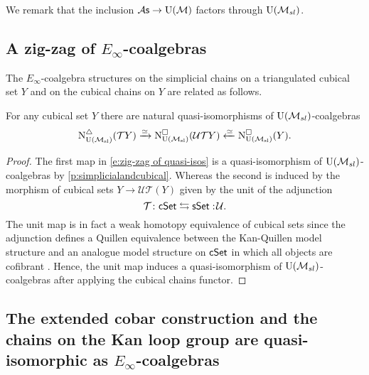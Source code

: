 We remark that the inclusion ${\mathcal{A}\mathsf{s}} \to {\operatorname{U}(\mathcal{M})}$ factors through ${\operatorname{U}(\mathcal{M}_{sl})}$.

\subsection{A zig-zag of $E_\infty$-coalgebras}
The $E_{\infty}$-coalgebra structures on the simplicial chains on a triangulated cubical set $Y$ and on the cubical chains on $Y$ are related as follows.

\begin{lemma} \label{l:zigzag} 
	For any cubical set $Y$ there are natural quasi-isomorphisms of ${\operatorname{U}(\mathcal{M}_{sl})}$-coalgebras
	\begin{equation} \label{e:zig-zag of quasi-isos}
	\operatorname{N^{\triangle}_{{\operatorname{U}(\mathcal{M}_{sl})}}}(\mathcal{T}Y) \xrightarrow{\simeq}
	\operatorname{N^{\square}_{{\operatorname{U}(\mathcal{M}_{sl})}}}(\mathcal{U}\mathcal{T}Y) \xleftarrow{\simeq}
	\operatorname{N^{\square}_{{\operatorname{U}(\mathcal{M}_{sl})}}}(Y).
	\end{equation}	
\end{lemma}

\begin{proof}
	The first map in \eqref{e:zig-zag of quasi-isos} is a quasi-isomorphism of ${\operatorname{U}(\mathcal{M}_{sl})}$-coalgebras by \cref{p:simplicialandcubical}.
	Whereas the second is induced by the morphism of cubical sets $Y \to \mathcal{U} \mathcal{T} (Y)$ given by the unit of the adjunction
	\begin{equation*}
	\mathcal{T} \colon \mathsf{cSet} \leftrightarrows \mathsf{sSet} :\! \mathcal{U}.
	\end{equation*}
	The unit map is in fact a weak homotopy equivalence of cubical sets since the adjunction defines a Quillen equivalence between the Kan-Quillen model structure and an analogue model structure on $\mathsf{cSet}$ in which all objects are cofibrant \cite{cisinski2006presheaves}.
	Hence, the unit map induces a quasi-isomorphism of ${\operatorname{U}(\mathcal{M}_{sl})}$-coalgebras after applying the cubical chains functor.
\end{proof}

\subsection{The extended cobar construction and the chains on the Kan loop group are quasi-isomorphic as $E_{\infty}$-coalgebras}


